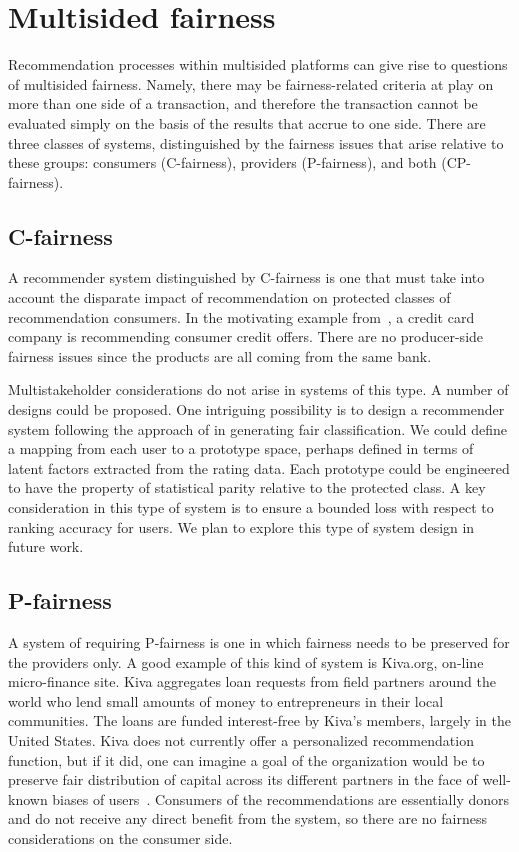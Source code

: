 \section{Multisided fairness}

Recommendation processes within multisided platforms can give rise to questions of multisided fairness. Namely, there may be fairness-related criteria at play on more than one side of a transaction, and therefore the transaction cannot be evaluated simply on the basis of the results that accrue to one side. There are three classes of systems, distinguished by the fairness issues that arise relative to these groups: consumers (C-fairness), providers (P-fairness), and both (CP-fairness).

\subsection{C-fairness}

A recommender system distinguished by C-fairness is one that must take into account the disparate impact of recommendation on protected classes of recommendation consumers. In the motivating example from~\cite{fairness}, a credit card company is recommending consumer credit offers. There are no producer-side fairness issues since the products are all coming from the same bank. 

Multistakeholder considerations do not arise in systems of this type. A number of designs could be proposed. One intriguing possibility is to design a recommender system following the approach of \cite{zemel2013learning} in generating fair classification. We could define a mapping from each user to a prototype space, perhaps defined in terms of latent factors extracted from the rating data. Each prototype could be engineered to have the property of statistical parity relative to the protected class. A key consideration in this type of system is to ensure a bounded loss with respect to ranking accuracy for users. We plan to explore this type of system design in future work. 

\subsection{P-fairness}

A system of requiring P-fairness is one in which fairness needs to be preserved for the providers only. A good example of this kind of system is Kiva.org, on-line micro-finance site. Kiva aggregates loan requests from field partners around the world who lend small amounts of money to entrepreneurs in their local communities. The loans are funded interest-free by Kiva's members, largely in the United States. Kiva does not currently offer a personalized recommendation function, but if it did, one can imagine a goal of the organization would be to preserve fair distribution of capital across its different partners in the face of well-known biases of users~\cite{lee2014fairness}. Consumers of the recommendations are essentially donors and do not receive any direct benefit from the system, so there are no fairness considerations on the consumer side. 

